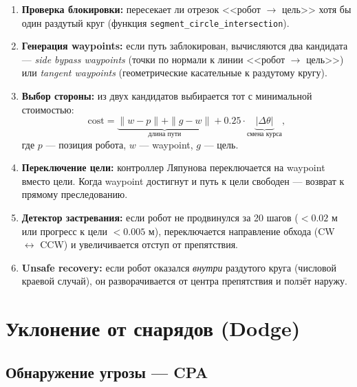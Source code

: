 \documentclass[12pt, a4paper]{article}
\theoremstyle{definition}
\theoremstyle{plain}
\begin{document}
\begin{enumerate}
  \item \textbf{Проверка блокировки:} пересекает ли отрезок <<робот $\to$ цель>>
        хотя бы один раздутый круг (функция \texttt{segment\_circle\_intersection}).

  \item \textbf{Генерация waypoints:} если путь заблокирован, вычисляются два
        кандидата --- \emph{side bypass waypoints} (точки по нормали к линии <<робот
        $\to$ цель>>) или \emph{tangent waypoints} (геометрические касательные
        к раздутому кругу).

  \item \textbf{Выбор стороны:} из двух кандидатов выбирается тот с минимальной
        стоимостью:
        \[
          \text{cost} = \underbrace{\|w - p\| + \|g - w\|}_{\text{длина пути}}
                      + 0.25 \cdot \underbrace{|\Delta\theta|}_{\text{смена курса}},
        \]
        где $p$ --- позиция робота, $w$ --- waypoint, $g$ --- цель.

  \item \textbf{Переключение цели:} контроллер Ляпунова переключается на waypoint
        вместо цели.  Когда waypoint достигнут и путь к цели свободен --- возврат
        к прямому преследованию.

  \item \textbf{Детектор застревания:} если робот не продвинулся за 20 шагов
        ($< 0.02$ м или прогресс к цели $< 0.005$ м), переключается направление
        обхода (CW $\leftrightarrow$ CCW) и увеличивается отступ от препятствия.

  \item \textbf{Unsafe recovery:} если робот оказался \emph{внутри} раздутого круга
        (числовой краевой случай), он разворачивается от центра препятствия и
        ползёт наружу.
\end{enumerate}

\section{Уклонение от снарядов (Dodge)}\label{sec:dodge}

\subsection{Обнаружение угрозы --- CPA}
\end{document}
